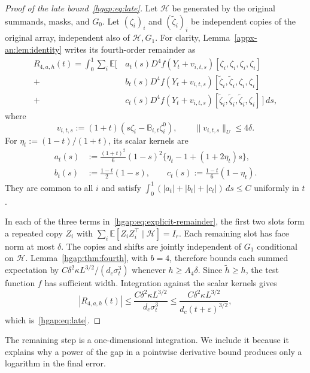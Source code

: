 \documentclass[11pt,letterpaper]{article}
\theoremstyle{remark}
\newcommand{\E}{\mathbb E}
\newcommand{\dd}{\,d}
\begin{document}
\begin{proof}[Proof of the late bound~\eqref{hgap:eq:late}]
Let $\mathcal H$ be generated by the original summands, masks, and
$G_0$. Let $(\zeta_i)_i$ and $(\widetilde\zeta_i)_i$ be independent
copies of the original array, independent also of $\mathcal H,G_1$.
For clarity, Lemma~\ref{appx-an:lem:identity} writes
its fourth-order remainder as
\begin{equation}\label{hgap:eq:explicit-remainder}
\begin{split}
 R_{4,a,h}(t)=\int_0^1\sum_i\E\bigl[\,
 &a_t(s)D^4f(Y_t+v_{i,t,s})[\zeta_i,\zeta_i,\zeta_i,\zeta_i]\\
 {}+{}&b_t(s)D^4f(Y_t+v_{i,t,s})
                    [\widetilde\zeta_i,\widetilde\zeta_i,\zeta_i,\zeta_i]\\
 {}+{}&c_t(s)D^4f(Y_t+v_{i,t,s})
           [\widetilde\zeta_i,\widetilde\zeta_i,\widetilde\zeta_i,\zeta_i]
                              \,\bigr]\dd s,
\end{split}
\end{equation}
where
\[
 v_{i,t,s}:=(1+t)(s\zeta_i-\mathbb B_{i,t}\zeta_i^0),
 \qquad \|v_{i,t,s}\|_U\le4\delta.
\]
For $\eta_t:=(1-t)/(1+t)$, its scalar kernels are
\begin{align*}
 a_t(s)&:=\frac{(1+t)^2}{6}(1-s)^2
                  \{\eta_t-1+(1+2\eta_t)s\},\\
 b_t(s)&:=\frac{1-t}{2}(1-s),\qquad
 c_t(s):=\frac{1-t}{6}(1-\eta_t).
\end{align*}
They are common to all $i$ and satisfy
$\int_0^1(|a_t|+|b_t|+|c_t|)\dd s\le C$ uniformly in $t$.

In each of the three terms in~\eqref{hgap:eq:explicit-remainder}, the first
two slots form a repeated copy $Z_i$ with
$\sum_i\E[Z_iZ_i^\top\mid\mathcal H]=I_r$.
Each remaining slot has face norm at most $\delta$. The copies and
shifts are jointly independent of $G_1$ conditional on $\mathcal H$.
Lemma~\ref{hgap:thm:fourth}, with $b=4$, therefore bounds each summed
expectation by $C\delta^2\kappa L^{3/2}/(d_c\sigma_t^3)$ whenever
$h\ge A_4\delta$. Since $\widetilde h\ge h$, the test function $f$
has sufficient width. Integration against the scalar kernels gives
\[
 |R_{4,a,h}(t)|\le\frac{C\delta^2\kappa L^{3/2}}{d_c\sigma_t^3}
     \le\frac{C\delta^2\kappa L^{3/2}}{d_c(t+\varepsilon)^{3/2}},
\]
which is~\eqref{hgap:eq:late}.
\end{proof}

The remaining step is a one-dimensional integration. We include it
because it explains why a power of the gap in a pointwise derivative
bound produces only a logarithm in the final error.
\end{document}

